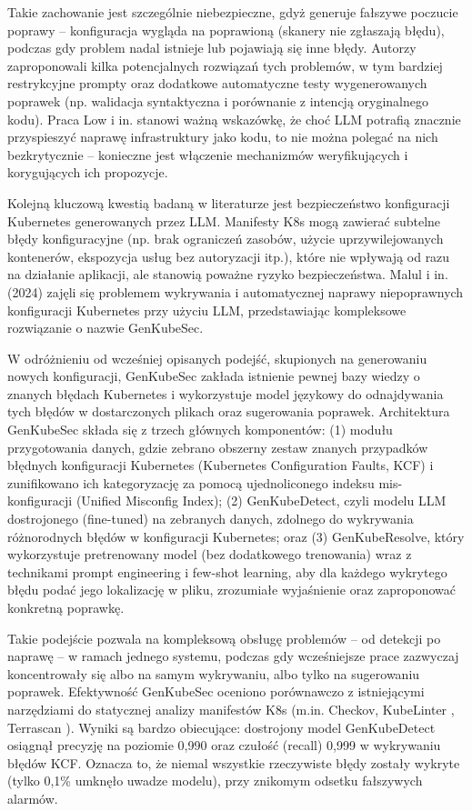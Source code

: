 Takie zachowanie jest szczególnie niebezpieczne, gdyż generuje fałszywe poczucie poprawy – konfiguracja wygląda na poprawioną (skanery nie zgłaszają błędu), podczas gdy problem nadal istnieje lub pojawiają się inne błędy. Autorzy zaproponowali kilka potencjalnych rozwiązań tych problemów, w tym bardziej restrykcyjne prompty oraz dodatkowe automatyczne testy wygenerowanych poprawek (np. walidacja syntaktyczna i porównanie z intencją oryginalnego kodu). Praca Low i in. stanowi ważną wskazówkę, że choć LLM potrafią znacznie przyspieszyć naprawę infrastruktury jako kodu, to nie można polegać na nich bezkrytycznie – konieczne jest włączenie mechanizmów weryfikujących i korygujących ich propozycje.

Kolejną kluczową kwestią badaną w literaturze jest bezpieczeństwo konfiguracji Kubernetes generowanych przez LLM. Manifesty K8s mogą zawierać subtelne błędy konfiguracyjne (np. brak ograniczeń zasobów, użycie uprzywilejowanych kontenerów, ekspozycja usług bez autoryzacji itp.), które nie wpływają od razu na działanie aplikacji, ale stanowią poważne ryzyko bezpieczeństwa. Malul i in. (2024) \cite{malul_genkubesec_2024} zajęli się problemem wykrywania i automatycznej naprawy niepoprawnych konfiguracji Kubernetes przy użyciu LLM, przedstawiając kompleksowe rozwiązanie o nazwie GenKubeSec.

W odróżnieniu od wcześniej opisanych podejść, skupionych na generowaniu nowych konfiguracji, GenKubeSec zakłada istnienie pewnej bazy wiedzy o znanych błędach Kubernetes i wykorzystuje model językowy do odnajdywania tych błędów w dostarczonych plikach oraz sugerowania poprawek. Architektura GenKubeSec składa się z trzech głównych komponentów: (1) modułu przygotowania danych, gdzie zebrano obszerny zestaw znanych przypadków błędnych konfiguracji Kubernetes (Kubernetes Configuration Faults, KCF) i zunifikowano ich kategoryzację za pomocą ujednoliconego indeksu mis-konfiguracji (Unified Misconfig Index); (2) GenKubeDetect, czyli modelu LLM dostrojonego (fine-tuned) na zebranych danych, zdolnego do wykrywania różnorodnych błędów w konfiguracji Kubernetes; oraz (3) GenKubeResolve, który wykorzystuje pretrenowany model (bez dodatkowego trenowania) wraz z technikami prompt engineering i few-shot learning, aby dla każdego wykrytego błędu podać jego lokalizację w pliku, zrozumiałe wyjaśnienie oraz zaproponować konkretną poprawkę.

Takie podejście pozwala na kompleksową obsługę problemów – od detekcji po naprawę – w ramach jednego systemu, podczas gdy wcześniejsze prace zazwyczaj koncentrowały się albo na samym wykrywaniu, albo tylko na sugerowaniu poprawek. Efektywność GenKubeSec oceniono porównawczo z istniejącymi narzędziami do statycznej analizy manifestów K8s (m.in. Checkov, KubeLinter \cite{kubelinter}, Terrascan \cite{terrascan}). Wyniki są bardzo obiecujące: dostrojony model GenKubeDetect osiągnął precyzję na poziomie 0,990 oraz czułość (recall) 0,999 w wykrywaniu błędów KCF. Oznacza to, że niemal wszystkie rzeczywiste błędy zostały wykryte (tylko 0,1\% umknęło uwadze modelu), przy znikomym odsetku fałszywych alarmów.

